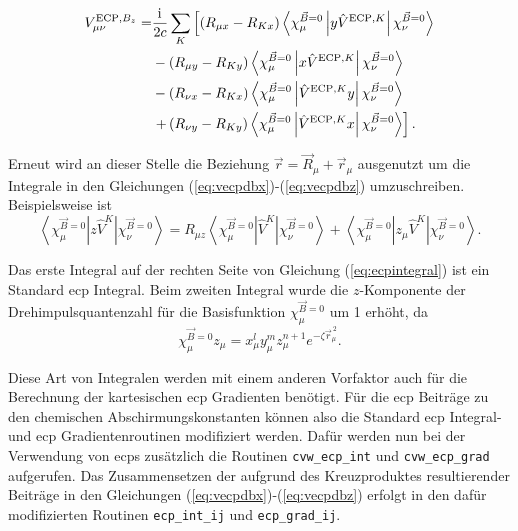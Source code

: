 	\begin{equation}\label{eq:vecpdbz}
	\begin{aligned}
	V_{\mu\nu}^{\textrm{ECP},B_z}=&\frac{\mathrm{i}\mkern1mu}{2c}\sum_K\left[\left(R_{\mu x}-R_{Kx}\right)\left\langle\chi_\mu^{\vec{B}=0}\left\vert y\hat{V}^{\textrm{ECP},K}\right\vert\chi_\nu^{\vec{B}=0}\right\rangle\right.\\
	&-\left(R_{\mu y}-R_{Ky}\right)\left\langle\chi_\mu^{\vec{B}=0}\left\vert x\hat{V}^{\textrm{ECP},K}\right\vert\chi_\nu^{\vec{B}=0}\right\rangle\\
	&-\left(R_{\nu x}-R_{Kx}\right)\left\langle\chi_\mu^{\vec{B}=0}\left\vert \hat{V}^{\textrm{ECP},K}y\right\vert\chi_\nu^{\vec{B}=0}\right\rangle\\
	&\left.+\left(R_{\nu y}-R_{Ky}\right)\left\langle\chi_\mu^{\vec{B}=0}\left\vert \hat{V}^{\textrm{ECP},K} x\right\vert\chi_\nu^{\vec{B}=0}\right\rangle\right].
	\end{aligned}
	\end{equation} 
	
	Erneut wird an dieser Stelle die Beziehung $\vec{r}=\vec{R}_\mu+\vec{r}_\mu$ ausgenutzt um die Integrale in den Gleichungen (\ref{eq:vecpdbx})-(\ref{eq:vecpdbz}) umzuschreiben. Beispielsweise ist 
	\begin{equation}\label{eq:ecpintegral}
	\left\langle\chi_\mu^{\vec{B}=0}\left\vert z\hat{V}^K\right\vert\chi_\nu^{\vec{B}=0}\right\rangle=R_{\mu z}\left\langle\chi_\mu^{\vec{B}=0}\left\vert \hat{V}^K\right\vert\chi_\nu^{\vec{B}=0}\right\rangle+\left\langle\chi_\mu^{\vec{B}=0}\left\vert z_\mu\hat{V}^K\right\vert\chi_\nu^{\vec{B}=0}\right\rangle.
	\end{equation}
	
	Das erste Integral auf der rechten Seite von Gleichung (\ref{eq:ecpintegral}) ist ein Standard \ac{ecp} Integral. Beim zweiten Integral wurde die $z$-Komponente der Drehimpulsquantenzahl für die Basisfunktion $\chi_\mu^{\vec{B}=0}$ um 1 erhöht, da
	\begin{equation}
	\chi_\mu^{\vec{B}=0}z_\mu=x_\mu^ly_\mu^mz_\mu^{n+1}e^{-\zeta\vec{r}^{\, 2}_\mu}.
	\end{equation}
	
	Diese Art von Integralen werden mit einem anderen Vorfaktor auch für die Berechnung der kartesischen \ac{ecp} Gradienten benötigt. Für die \ac{ecp} Beiträge zu den chemischen Abschirmungskonstanten können also die Standard \ac{ecp} Integral- und \ac{ecp} Gradientenroutinen modifiziert werden. Dafür werden nun bei der Verwendung von \acp{ecp} zusätzlich die Routinen \texttt{cvw\_ecp\_int} und \texttt{cvw\_ecp\_grad} aufgerufen. Das Zusammensetzen der aufgrund des Kreuzproduktes resultierender Beiträge in den Gleichungen (\ref{eq:vecpdbx})-(\ref{eq:vecpdbz}) erfolgt in den dafür modifizierten Routinen \texttt{ecp\_int\_ij} und \texttt{ecp\_grad\_ij}.

